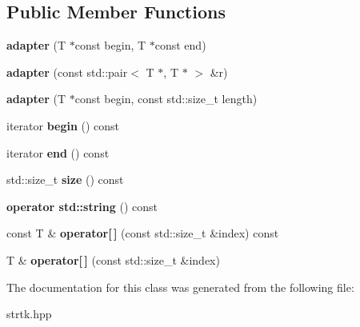 \subsection*{Public Member Functions}
\begin{DoxyCompactItemize}
\item 
\hypertarget{classstrtk_1_1range_1_1adapter_a5c5f120d804492d211e88707d62ada97}{{\bfseries adapter} (T $\ast$const begin, T $\ast$const end)}\label{classstrtk_1_1range_1_1adapter_a5c5f120d804492d211e88707d62ada97}

\item 
\hypertarget{classstrtk_1_1range_1_1adapter_a6640d258dde54dc6978bef791ea0c26f}{{\bfseries adapter} (const std\-::pair$<$ T $\ast$, T $\ast$ $>$ \&r)}\label{classstrtk_1_1range_1_1adapter_a6640d258dde54dc6978bef791ea0c26f}

\item 
\hypertarget{classstrtk_1_1range_1_1adapter_a87d84a86d756d53643d3f4d00084c50c}{{\bfseries adapter} (T $\ast$const begin, const std\-::size\-\_\-t length)}\label{classstrtk_1_1range_1_1adapter_a87d84a86d756d53643d3f4d00084c50c}

\item 
\hypertarget{classstrtk_1_1range_1_1adapter_a3ffb035dd53c9dff60967ca36833fa73}{iterator {\bfseries begin} () const }\label{classstrtk_1_1range_1_1adapter_a3ffb035dd53c9dff60967ca36833fa73}

\item 
\hypertarget{classstrtk_1_1range_1_1adapter_a413874b150b2a1b6f23f4b94f84df921}{iterator {\bfseries end} () const }\label{classstrtk_1_1range_1_1adapter_a413874b150b2a1b6f23f4b94f84df921}

\item 
\hypertarget{classstrtk_1_1range_1_1adapter_a9a31b387a9aa6970a03ea97966c04b26}{std\-::size\-\_\-t {\bfseries size} () const }\label{classstrtk_1_1range_1_1adapter_a9a31b387a9aa6970a03ea97966c04b26}

\item 
\hypertarget{classstrtk_1_1range_1_1adapter_a5ce7d2221cdc5574348f40289ebba935}{{\bfseries operator std\-::string} () const }\label{classstrtk_1_1range_1_1adapter_a5ce7d2221cdc5574348f40289ebba935}

\item 
\hypertarget{classstrtk_1_1range_1_1adapter_a65eca9dee774657f6982395f8b7bed73}{const T \& {\bfseries operator\mbox{[}$\,$\mbox{]}} (const std\-::size\-\_\-t \&index) const }\label{classstrtk_1_1range_1_1adapter_a65eca9dee774657f6982395f8b7bed73}

\item 
\hypertarget{classstrtk_1_1range_1_1adapter_a305c7b6cb7fdcc9d1a11d8d07b26854b}{T \& {\bfseries operator\mbox{[}$\,$\mbox{]}} (const std\-::size\-\_\-t \&index)}\label{classstrtk_1_1range_1_1adapter_a305c7b6cb7fdcc9d1a11d8d07b26854b}

\end{DoxyCompactItemize}


The documentation for this class was generated from the following file\-:\begin{DoxyCompactItemize}
\item 
strtk.\-hpp\end{DoxyCompactItemize}
